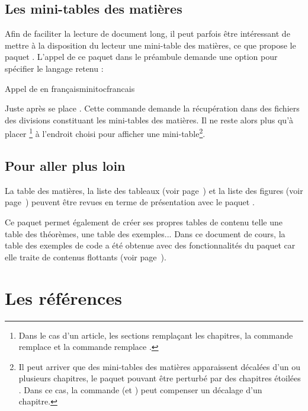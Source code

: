 \subsection{Les mini-tables des matières} 

Afin de faciliter la lecture de document long, il peut parfois être intéressant de mettre à la disposition du lecteur une mini-table des matières, ce que propose le paquet . L'appel de ce paquet dans le préambule demande une option pour spécifier le langage retenu :
\begin{codesimple}{Appel de  en français}{minitocfrancais}
\usepackage[french]{minitoc}
\end{codesimple}

Juste après  se place . Cette commande demande la récupération dans des fichiers des divisions constituant les mini-tables des matières. Il ne reste alors plus qu'à placer \footnote{Dans le cas d'un article, les sections remplaçant les chapitres, la commande  remplace  et la commande  remplace .} à l'endroit choisi pour afficher une mini-table\footnote{Il peut arriver que des mini-tables des matières apparaissent décalées d'un ou plusieurs chapitres, le paquet  pouvant être perturbé par des chapitres \og étoilées \fg. Dans ce cas, la  commande  (et ) peut compenser un décalage d'un chapitre.}.

\subsection{Pour aller plus loin}

La table des matières, la liste des tableaux (voir page~\pageref{flottants}) et la liste des figures (voir page~\pageref{images}) peuvent être revues en terme de présentation avec le paquet . 

Ce paquet permet également de créer ses propres tables de contenu telle une table des théorèmes, une table des exemples... Dans ce document de cours, la table des exemples de code a été obtenue avec des fonctionnalités du paquet  car elle traite de contenus flottants (voir page~\pageref{flottants}).


\section{Les références}  \label{référence} 

